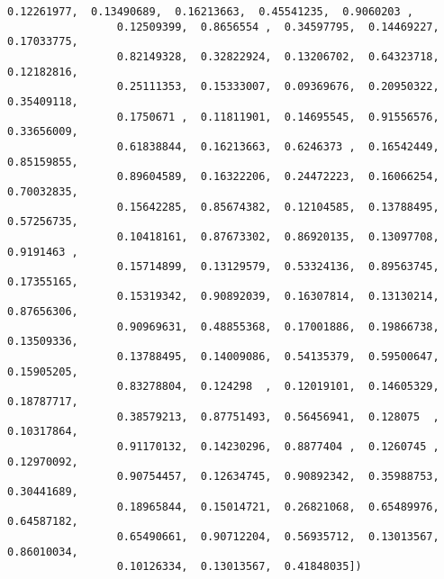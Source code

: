 \documentclass[11pt]{article}
\begin{document}
\begin{Verbatim}[commandchars=\\\{\}]
                 0.12261977,  0.13490689,  0.16213663,  0.45541235,  0.9060203 ,
                 0.12509399,  0.8656554 ,  0.34597795,  0.14469227,  0.17033775,
                 0.82149328,  0.32822924,  0.13206702,  0.64323718,  0.12182816,
                 0.25111353,  0.15333007,  0.09369676,  0.20950322,  0.35409118,
                 0.1750671 ,  0.11811901,  0.14695545,  0.91556576,  0.33656009,
                 0.61838844,  0.16213663,  0.6246373 ,  0.16542449,  0.85159855,
                 0.89604589,  0.16322206,  0.24472223,  0.16066254,  0.70032835,
                 0.15642285,  0.85674382,  0.12104585,  0.13788495,  0.57256735,
                 0.10418161,  0.87673302,  0.86920135,  0.13097708,  0.9191463 ,
                 0.15714899,  0.13129579,  0.53324136,  0.89563745,  0.17355165,
                 0.15319342,  0.90892039,  0.16307814,  0.13130214,  0.87656306,
                 0.90969631,  0.48855368,  0.17001886,  0.19866738,  0.13509336,
                 0.13788495,  0.14009086,  0.54135379,  0.59500647,  0.15905205,
                 0.83278804,  0.124298  ,  0.12019101,  0.14605329,  0.18787717,
                 0.38579213,  0.87751493,  0.56456941,  0.128075  ,  0.10317864,
                 0.91170132,  0.14230296,  0.8877404 ,  0.1260745 ,  0.12970092,
                 0.90754457,  0.12634745,  0.90892342,  0.35988753,  0.30441689,
                 0.18965844,  0.15014721,  0.26821068,  0.65489976,  0.64587182,
                 0.65490661,  0.90712204,  0.56935712,  0.13013567,  0.86010034,
                 0.10126334,  0.13013567,  0.41848035])
\end{Verbatim}
            

    
    
    
    
\end{document}
